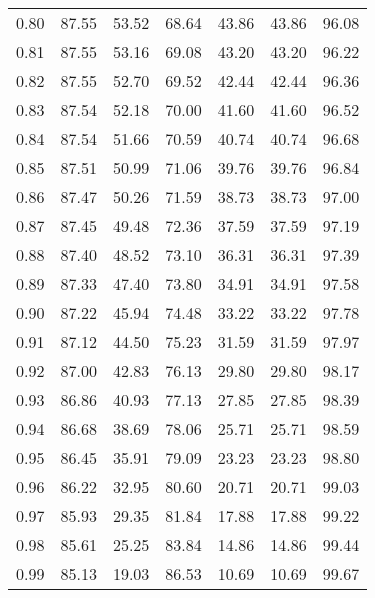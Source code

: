 \begin{tabular}{|c|c|c|c|c|c|c|}
      0.80 &     87.55 &     53.52 &      68.64 &   43.86 &      43.86 &         96.08 \\
      0.81 &     87.55 &     53.16 &      69.08 &   43.20 &      43.20 &         96.22 \\
      0.82 &     87.55 &     52.70 &      69.52 &   42.44 &      42.44 &         96.36 \\
      0.83 &     87.54 &     52.18 &      70.00 &   41.60 &      41.60 &         96.52 \\
      0.84 &     87.54 &     51.66 &      70.59 &   40.74 &      40.74 &         96.68 \\
      0.85 &     87.51 &     50.99 &      71.06 &   39.76 &      39.76 &         96.84 \\
      0.86 &     87.47 &     50.26 &      71.59 &   38.73 &      38.73 &         97.00 \\
      0.87 &     87.45 &     49.48 &      72.36 &   37.59 &      37.59 &         97.19 \\
      0.88 &     87.40 &     48.52 &      73.10 &   36.31 &      36.31 &         97.39 \\
      0.89 &     87.33 &     47.40 &      73.80 &   34.91 &      34.91 &         97.58 \\
      0.90 &     87.22 &     45.94 &      74.48 &   33.22 &      33.22 &         97.78 \\
      0.91 &     87.12 &     44.50 &      75.23 &   31.59 &      31.59 &         97.97 \\
      0.92 &     87.00 &     42.83 &      76.13 &   29.80 &      29.80 &         98.17 \\
      0.93 &     86.86 &     40.93 &      77.13 &   27.85 &      27.85 &         98.39 \\
      0.94 &     86.68 &     38.69 &      78.06 &   25.71 &      25.71 &         98.59 \\
      0.95 &     86.45 &     35.91 &      79.09 &   23.23 &      23.23 &         98.80 \\
      0.96 &     86.22 &     32.95 &      80.60 &   20.71 &      20.71 &         99.03 \\
      0.97 &     85.93 &     29.35 &      81.84 &   17.88 &      17.88 &         99.22 \\
      0.98 &     85.61 &     25.25 &      83.84 &   14.86 &      14.86 &         99.44 \\
      0.99 &     85.13 &     19.03 &      86.53 &   10.69 &      10.69 &         99.67 \\
\bottomrule
\end{tabular}
